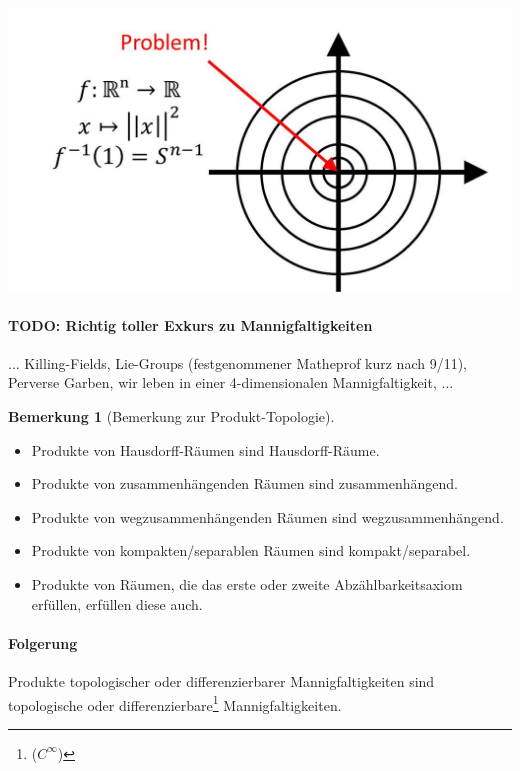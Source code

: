 \documentclass[a4paper,11pt,notitlepage]{report}
\theoremstyle{definition}
\newtheorem{remark}{Bemerkung}[chapter]
\begin{document}
\includegraphics[scale=0.3]{images/Norm_invers.jpg}

\paragraph{TODO: Richtig toller Exkurs zu Mannigfaltigkeiten}... Killing-Fields, Lie-Groups (festgenommener Matheprof kurz nach 9/11), Perverse Garben, wir leben in einer 4-dimensionalen Mannigfaltigkeit, ...

\begin{remark}[Bemerkung zur Produkt-Topologie]
$\text{ }$
\begin{itemize}
	\item Produkte von Hausdorff-Räumen sind Hausdorff-Räume.
	\item Produkte von zusammenhängenden Räumen sind zusammenhängend.
	\item Produkte von wegzusammenhängenden Räumen sind wegzusammenhängend.
	\item Produkte von kompakten/separablen Räumen sind kompakt/separabel.
	\item Produkte von Räumen, die das erste oder zweite Abzählbarkeitsaxiom erfüllen, erfüllen diese auch.
\end{itemize}
 
\paragraph{Folgerung}
	Produkte topologischer oder differenzierbarer Mannigfaltigkeiten sind topologische oder differenzierbare\footnote{($C^\infty$)} Mannigfaltigkeiten.
\end{remark}
 
\end{document}
